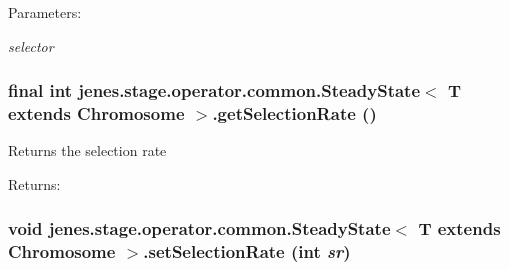 \begin{Desc}
\item[Parameters:]
\begin{description}
\item[{\em selector}]\end{description}
\end{Desc}
\hypertarget{classjenes_1_1stage_1_1operator_1_1common_1_1_steady_state_3_01_t_01extends_01_chromosome_01_4_667fecf88fd68c6a89de0ee327eb9dcf}{
\subsubsection[getSelectionRate]{\setlength{\rightskip}{0pt plus 5cm}final int jenes.stage.operator.common.SteadyState$<$ T extends Chromosome $>$.getSelectionRate ()}}
\label{classjenes_1_1stage_1_1operator_1_1common_1_1_steady_state_3_01_t_01extends_01_chromosome_01_4_667fecf88fd68c6a89de0ee327eb9dcf}


Returns the selection rate

\begin{Desc}
\item[Returns:]\end{Desc}
\hypertarget{classjenes_1_1stage_1_1operator_1_1common_1_1_steady_state_3_01_t_01extends_01_chromosome_01_4_d3182abb1581d4136efe349b46c4dba9}{
\subsubsection[setSelectionRate]{\setlength{\rightskip}{0pt plus 5cm}void jenes.stage.operator.common.SteadyState$<$ T extends Chromosome $>$.setSelectionRate (int {\em sr})}}
\label{classjenes_1_1stage_1_1operator_1_1common_1_1_steady_state_3_01_t_01extends_01_chromosome_01_4_d3182abb1581d4136efe349b46c4dba9}


